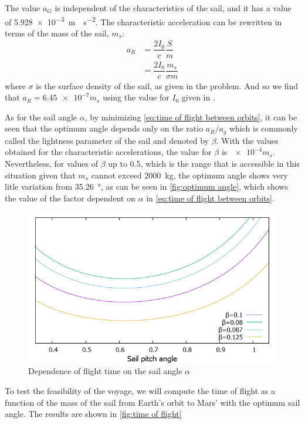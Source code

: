 \documentclass[twocolumn,12pt,a4paper]{article}
\numberwithin{equation}{section}
\begin{document}
The value \( a_G \) is independent of the characteristics of the sail, and it has a value of \SI{5,928e-3}{m \cdot s^{-2}}. The characteristic acceleration can be rewritten in terms of the mass of the sail, \( m_s \):
\begin{align*}
  a_R &= \dfrac{2I_0}{c} \dfrac{S}{m} \\
  		&= \dfrac{2I_0}{c} \dfrac{m_s}{\sigma m}
\end{align*}
where \( \sigma \) is the surface density of the sail, as given in the problem. And so we find that \( a_R = \num{6,45e-7} m_s \) using the value for \( I_0 \) given in \cite{hollerman}.

As for the sail angle \( \alpha \), by minimizing \autoref{eq:time of flight between orbits}, it can be seen that the optimum angle depends only on the ratio \( a_R / a_g \) which is commonly called the lightness parameter of the sail and denoted by \( \beta \).  With the values obtained for the characteristic accelerations, the value for \( \beta \) is \( \num{e-4} m_s \). Nevertheless, for values of \( \beta \) up to 0.5, which is the range that is accessible in this situation given that \( m_s \) cannot exceed \SI{2000}{kg}, the optimum angle shows very litle variation from \SI{35.26}{\degree}, as can be seen in \autoref{fig:optimum angle}, which shows the value of the factor dependent on \( \alpha \) in \autoref{eq:time of flight between orbits}.

\begin{figure} 
	\centering
	\includegraphics[scale=0.3]{angle.png}
	\caption{Dependence of flight time on the sail angle $\alpha$}
	\label{fig:optimum angle}
\end{figure}

To test the feasibility of the voyage, we will compute the time of flight as a function of the mass of the sail from Earth's orbit to Mars' with the optimum sail angle. The results are shown in \autoref{fig:time of flight}
\end{document}
